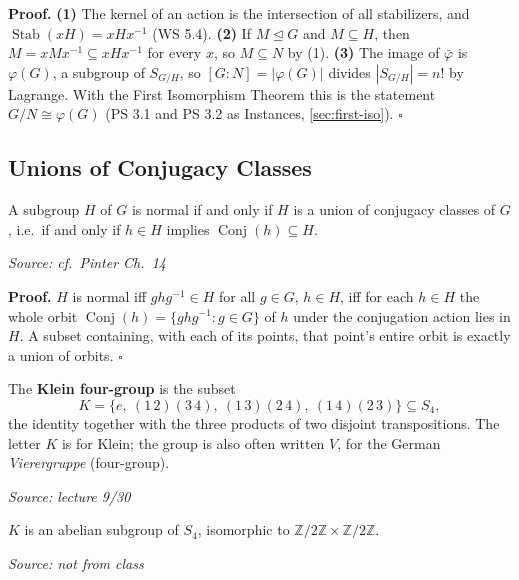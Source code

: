\documentclass[11pt]{report}
\renewenvironment{proof}[1][Proof]{\noindent\textbf{#1.} }{\hfill$\square$\par\vspace{5pt}}
\newcommand{\srcline}[1]{\par\hfill{\footnotesize\textit{Source: #1}}}
\begin{document}
\begin{proof}
\textbf{(1)} The kernel of an action is the intersection of all stabilizers, and $\operatorname{Stab}(xH) = xHx^{-1}$ (WS 5.4). \textbf{(2)} If $M \trianglelefteq G$ and $M \subseteq H$, then $M = xMx^{-1} \subseteq xHx^{-1}$ for every $x$, so $M \subseteq N$ by (1). \textbf{(3)} The image of $\bar\varphi$ is $\varphi(G)$, a subgroup of $S_{G/H}$, so $[G : N] = |\varphi(G)|$ divides $|S_{G/H}| = n!$ by Lagrange. With the First Isomorphism Theorem this is the statement $G/N \cong \varphi(G)$ (PS 3.1 and PS 3.2 as Instances, \ref{sec:first-iso}).
\end{proof}

\subsection{Unions of Conjugacy Classes}

\begin{propbox}\label{prop:normal-subgroups-unions-conjugacy-classes}
A subgroup $H$ of $G$ is normal if and only if $H$ is a union of conjugacy classes of $G$, i.e.\ if and only if $h \in H$ implies $\operatorname{Conj}(h) \subseteq H$.
\srcline{cf.\ Pinter Ch.\ 14}
\end{propbox}

\begin{proof}
$H$ is normal iff $ghg^{-1} \in H$ for all $g \in G$, $h \in H$, iff for each $h \in H$ the whole orbit $\operatorname{Conj}(h) = \{ghg^{-1} : g \in G\}$ of $h$ under the conjugation action lies in $H$. A subset containing, with each of its points, that point's entire orbit is exactly a union of orbits.
\end{proof}

\begin{defbox}\label{def:klein-four-group}
The \textbf{Klein four-group} is the subset
\[ K = \{e,\ (1\,2)(3\,4),\ (1\,3)(2\,4),\ (1\,4)(2\,3)\} \subseteq S_4, \]
the identity together with the three products of two disjoint transpositions. The letter $K$ is for Klein; the group is also often written $V$, for the German \emph{Vierergruppe} (four-group).
\srcline{lecture 9/30}
\end{defbox}

\begin{propbox}\label{prop:klein-four-group}
$K$ is an abelian subgroup of $S_4$, isomorphic to $\mathbb{Z}/2\mathbb{Z} \times \mathbb{Z}/2\mathbb{Z}$.
\srcline{not from class}
\end{propbox}
\end{document}
